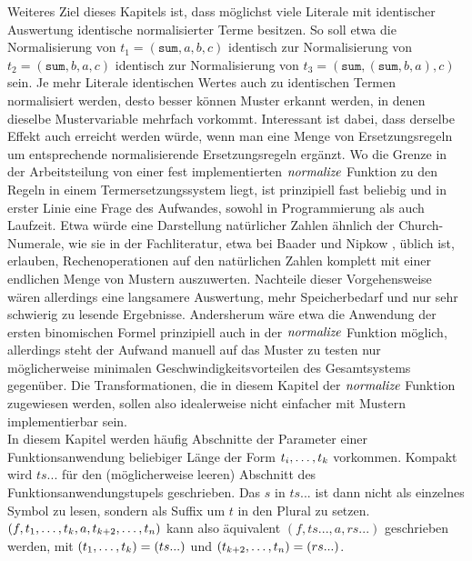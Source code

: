 Weiteres Ziel dieses Kapitels ist, dass möglichst viele Literale mit identischer Auswertung identische normalisierter Terme besitzen. So soll etwa die Normalisierung von $t_1 = (\texttt{sum}, a, b, c)$ identisch zur Normalisierung von $t_2 = (\texttt{sum}, b, a, c)$ identisch zur Normalisierung von $t_3 = (\texttt{sum}, (\texttt{sum}, b, a), c)$ sein. Je mehr Literale identischen Wertes auch zu identischen Termen normalisiert werden, desto besser können Muster erkannt werden, in denen dieselbe Mustervariable mehrfach vorkommt. Interessant ist dabei, dass derselbe Effekt auch erreicht werden würde, wenn man eine Menge von Ersetzungsregeln um entsprechende normalisierende Ersetzungsregeln ergänzt. Wo die Grenze in der Arbeitsteilung von einer fest implementierten $\mathit{normalize}$ Funktion zu den Regeln in einem Termersetzungssystem liegt, ist prinzipiell fast beliebig und in erster Linie eine Frage des Aufwandes, sowohl in Programmierung als auch Laufzeit. Etwa würde eine Darstellung natürlicher Zahlen ähnlich der Church-Numerale, wie sie in der Fachliteratur, etwa bei Baader und Nipkow \cite{baader_nipkow_1998}, üblich ist, erlauben, Rechenoperationen auf den natürlichen Zahlen komplett mit einer endlichen Menge von Mustern auszuwerten. Nachteile dieser Vorgehensweise wären allerdings eine langsamere Auswertung, mehr Speicherbedarf und nur sehr schwierig zu lesende Ergebnisse. Andersherum wäre etwa die Anwendung der ersten binomischen Formel prinzipiell auch in der $\mathit{normalize}$ Funktion möglich, allerdings steht der Aufwand manuell auf das Muster zu testen nur möglicherweise minimalen Geschwindigkeitsvorteilen des Gesamtsystems gegenüber. Die Transformationen, die in diesem Kapitel der $\mathit{normalize}$ Funktion zugewiesen werden, sollen also idealerweise nicht einfacher mit Mustern implementierbar sein.\\

In diesem Kapitel werden häufig Abschnitte der Parameter einer Funktionsanwendung beliebiger Länge der Form ${t}_{i}, \dots, {t}_{k}$ vorkommen. Kompakt wird $ts...$ für den (möglicher\-weise leeren) Abschnitt des Funktionsanwendungstupels geschrieben. Das $s$ in $ts...$ ist dann nicht als einzelnes Symbol zu lesen, sondern als Suffix um $t$ in den Plural zu setzen. \\$(f, {t}_{1}, \dots, {t}_{k}, a, {t}_{k+2}, \dots, {t}_{n})$ kann also äquivalent $(f, ts..., a, rs...)$ geschrieben werden, mit $({t}_{1}, \dots, {t}_{k}) = (ts...)$ und $({t}_{k+2}, \dots, {t}_{n}) = (rs...)$.\\


